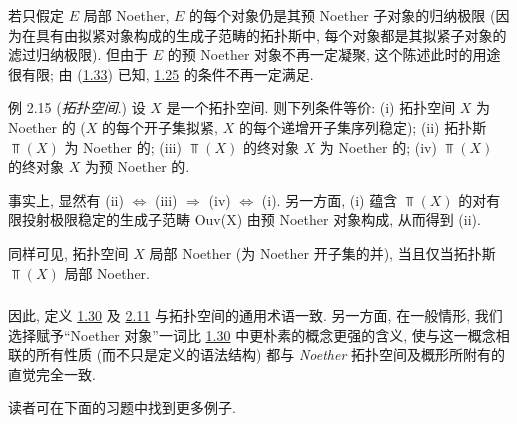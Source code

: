 若只假定 $E$ 局部 Noether,
$E$ 的每个对象仍是其预 Noether 子对象的归纳极限
(因为在具有由\pageoriginale{}拟紧对象构成的生成子范畴的拓扑斯中,
每个对象都是其拟紧子对象的滤过归纳极限).
但由于 $E$ 的预 Noether 对象不再一定凝聚,
这个陈述此时的用途很有限;
由 (\hyperref[VI.exem1.33]{1.33}) 已知,
\hyperref[VI.cor1.25]{1.25} 的条件不再一定满足.

\begin{enonce*}[remark]{例 2.15}
(\emph{拓扑空间}.) 设 $X$ 是一个拓扑空间.
则下列条件等价:
(i) 拓扑空间 $X$ 为 Noether 的
(\ie $X$ 的每个开子集拟紧,
\ie $X$ 的每个递增开子集序列稳定);
(ii) 拓扑斯 $\Top(X)$ 为 Noether 的;
(iii) $\Top(X)$ 的终对象 $X$ 为 Noether 的;
(iv) $\Top(X)$ 的终对象 $X$ 为预 Noether 的.

事实上, 显然有 (ii) $\Leftrightarrow$ (iii) $\Rightarrow$ (iv)
$\Leftrightarrow$ (i).
另一方面, (i) 蕴含 $\Top(X)$ 的对有限投射极限稳定的生成子范畴 Ouv(X)
由预 Noether 对象构成, 从而得到 (ii).

同样可见, 拓扑空间 $X$ 局部 Noether
(\ie 为 Noether 开子集的并),
当且仅当拓扑斯 $\Top(X)$ 局部 Noether.
\end{enonce*}

\setcounter{subsection}{15}
\setcounter{subsubsection}{0}
\subsubsection{}
因此, 定义 \hyperref[VI.def1.30]{1.30}
及 \hyperref[VI.def2.11]{2.11}
与拓扑空间的通用术语一致.
另一方面, 在一般情形,
我们选择赋予“Noether 对象”一词比
\hyperref[VI.def1.30]{1.30} 中更朴素的概念更强的\pageoriginale{}含义,
使与这一概念相联的所有性质
(而不只是定义的语法结构)
都与 \emph{Noether} 拓扑空间及概形所附有的直觉完全一致.

读者可在下面的习题中找到更多例子.

